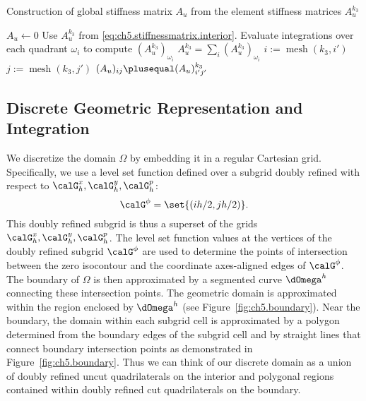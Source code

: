 \begin{algorithm}[htbp]
\caption{Construction of global stiffness matrix $A_u$ from the element stiffness matrices $A_u^{k_3}$}
\label{alg:ch5.stiffnessmatrix.construction}
\begin{algorithmic}[1]
\STATE $A_u \leftarrow 0$
        \STATE Use $A_u^{k_3}$ from \eqref{eq:ch5.stiffnessmatrix.interior}.
    \ELSE
        \STATE Evaluate integrations over each quadrant $\omega_i$ to compute $(A_u^{k_3})_{\omega_i}$
        \STATE $A_u^{k_3} = \sum_i (A_u^{k_3})_{\omega_i}$
    \ENDIF
        \STATE $i := \operatorname{mesh}(k_3,i')$ 
            \STATE $j := \operatorname{mesh}(k_3,j')$
            \STATE $(A_u)_{ij} \plusequal (A_u)^{k_3}_{i'j'}$
        \ENDFOR
    \ENDFOR
\ENDFOR
\end{algorithmic}
\end{algorithm}

\subsection{Discrete Geometric Representation and Integration} \label{subsec:ch5.discretization.geometry}

We discretize the domain $\Omega$ by embedding it in a regular Cartesian grid. Specifically, we use a level set function defined over a subgrid doubly refined with respect to $\calG^x_h, \calG^y_h, \calG^p_h$:
\begin{equation*}
\calG^{\phi} = \set{(ih/2, jh/2)}.
\end{equation*}
This doubly refined subgrid is thus a superset of the grids $\calG^x_h, \calG^y_h, \calG^p_h$. The level set function values at the vertices of the doubly refined subgrid $\calG^{\phi}$ are used to determine the points of intersection between the zero isocontour and the coordinate axes-aligned edges of $\calG^{\phi}$. The boundary of $\Omega$ is then approximated by a segmented curve $\dOmega^h$ connecting these intersection points. The geometric domain is approximated within the region enclosed by $\dOmega^h$ (see Figure~\ref{fig:ch5.boundary}). Near the boundary, the domain within each subgrid cell is approximated by a polygon determined from the boundary edges of the subgrid cell and by straight lines that connect boundary intersection points as demonstrated in Figure~\ref{fig:ch5.boundary}. Thus we can think of our discrete domain as a union of doubly refined uncut quadrilaterals on the interior and polygonal regions contained within doubly refined cut quadrilaterals on the boundary.

